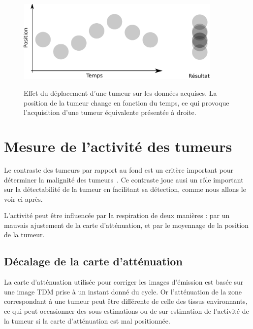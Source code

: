 \begin{figure}[h!]
    \begin{center}
            \includegraphics[width=10cm]{images/moyennageImage} \\
    \end{center}
    \caption[Effet du déplacement d'une tumeur sur les données acquises]{Effet du déplacement d'une tumeur sur les données acquises. La position de la tumeur change en fonction du temps, ce qui provoque l'acquisition d'une tumeur équivalente présentée à droite.}
    \label{fig:effetMvt}
\end{figure}


\section{Mesure de l'activité des tumeurs}

Le contraste des tumeurs par rapport au fond est un critère important pour déterminer la malignité des tumeurs~\cite{dimitrakopoulou2002role, krak2005effects}. Ce contraste joue ausi un rôle important sur la détectabilité de la tumeur en facilitant sa détection, comme nous allons le voir ci-après.

L'activité peut être influencée par la respiration de deux manières : par un mauvais ajustement de la carte d'atténuation, et par le moyennage de la position de la tumeur.

\subsection{Décalage de la carte d'atténuation}


La carte d'atténuation utilisée pour corriger les images d'émission est basée sur une image TDM prise à un instant donné du cycle. Or l'atténuation de la zone correspondant à une tumeur peut être différente de celle des tissus environnants, ce qui peut occasionner des sous-estimations ou de sur-estimation de l'activité de la tumeur si la carte d'atténuation est mal positionnée.

